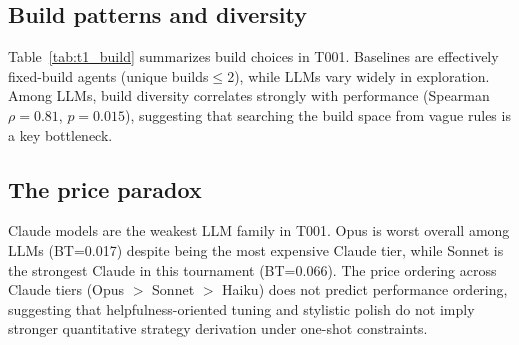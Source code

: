 \documentclass[11pt]{article}
\newcommand{\tOne}{T001}
\begin{document}
\subsection{Build patterns and diversity}

Table~\ref{tab:t1_build} summarizes build choices in \tOne.
Baselines are effectively fixed-build agents (unique builds$\le$2), while LLMs vary widely in exploration.
Among LLMs, build diversity correlates strongly with performance (Spearman $\rho=0.81$, $p=0.015$), suggesting that searching the build space from vague rules is a key bottleneck.

\subsection{The price paradox}

Claude models are the weakest LLM family in \tOne.
Opus is worst overall among LLMs (BT=0.017) despite being the most expensive Claude tier, while Sonnet is the strongest Claude in this tournament (BT=0.066).
The price ordering across Claude tiers (Opus $>$ Sonnet $>$ Haiku) does not predict performance ordering, suggesting that helpfulness-oriented tuning and stylistic polish do not imply stronger quantitative strategy derivation under one-shot constraints.
\end{document}
